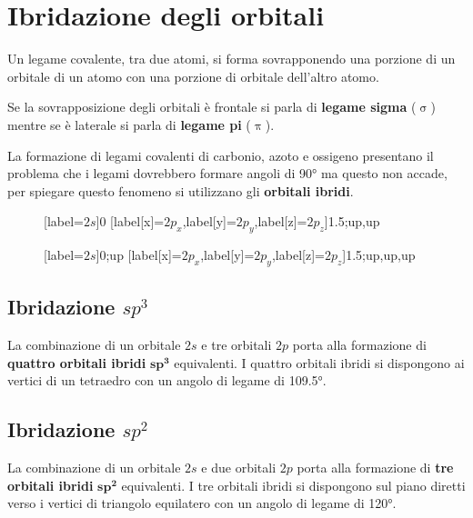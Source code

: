 \section{Ibridazione degli orbitali}
Un legame covalente, tra due atomi, si forma sovrapponendo una porzione di un orbitale di un atomo con una porzione di orbitale dell'altro atomo.

Se la sovrapposizione degli orbitali è frontale si parla di \textbf{legame sigma} (\(\upsigma\)) mentre se è laterale si parla di \textbf{legame pi} (\(\uppi\)).

La formazione di legami covalenti di carbonio, azoto e ossigeno presentano il problema che i legami dovrebbero formare angoli di \ang{90} ma questo non accade, per spiegare questo fenomeno si utilizzano gli \textbf{orbitali ibridi}.

\begin{figure}[H]
	\centering
	\begin{modiagram}[style=round]
		[label={\(2s\)}]{0}
		[label[x]={\(2p_x\)},label[y]={\(2p_y\)},label[z]={\(2p_z\)}]{1.5;up,up}
	\end{modiagram}\quad
	\quad
	\begin{modiagram}[style=round]
		[label={\(2s\)}]{0;up}
		[label[x]={\(2p_x\)},label[y]={\(2p_y\)},label[z]={\(2p_z\)}]{1.5;up,up,up}
	\end{modiagram}
\end{figure}

\begingroup
{}
\subsection{Ibridazione \texorpdfstring{\(sp^3\)}{sp3}}
La combinazione di un orbitale \(2s\) e tre orbitali \(2p\) porta alla formazione di \textbf{quattro orbitali ibridi} \(\mathbf{sp^3}\) equivalenti. I quattro orbitali ibridi si dispongono ai vertici di un tetraedro con un angolo di legame di \ang{109.5}.

\begin{center}
\end{center}

\subsection{Ibridazione \texorpdfstring{\(sp^2\)}{sp2}}
La combinazione di un orbitale \(2s\) e due orbitali \(2p\) porta alla formazione di \textbf{tre orbitali ibridi} \(\mathbf{sp^2}\) equivalenti. I tre orbitali ibridi si dispongono sul piano diretti verso i vertici di triangolo equilatero con un angolo di legame di \ang{120}.

